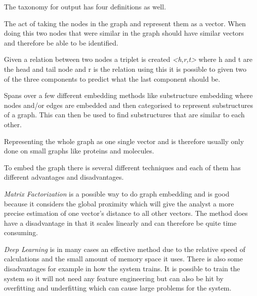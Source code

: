 The taxonomy for output has four definitions as well.

\begin{definition} The act of taking the nodes in the graph and represent them as a vector. When doing this two nodes that were similar in the graph should have similar vectors and therefore be able to be identified\cite{8294302}.
\end{definition}

\begin{definition} Given a relation between two nodes a triplet is created \textit{<h,r,t>}  where h and t are the head and tail node and r is the relation using this it is possible to given two of the three components to predict what the last component should be\cite{8294302}.
\end{definition}

\begin{definition} Spans over a few different embedding methods like substructure embedding where nodes and/or edges are embedded and then categorised to represent substructures of a graph. This can then be used to find substructures that are similar to each other\cite{8294302}.
\end{definition}

\begin{definition} Representing the whole graph as one single vector and is therefore usually only done on small graphs like proteins and molecules\cite{8294302}. 
\end{definition}

To embed the graph there is several different techniques and each of them has different advantages and disadvantages.

\textit{Matrix Factorization} is a possible way to do graph embedding and is good because it considers the global proximity which will give the analyst a more precise estimation of one vector's distance to all other vectors. The method does have a disadvantage in that it scales linearly and can therefore be quite time consuming\cite{8294302}.

\textit{Deep Learning} is in many cases an effective method due to the relative speed of calculations and the small amount of memory space it uses. There is also some disadvantages for example in how the system trains. It is possible to train the system so it will not need any feature engineering but can also be hit by overfitting and underfitting which can cause large problems for the system\cite{8294302}.

